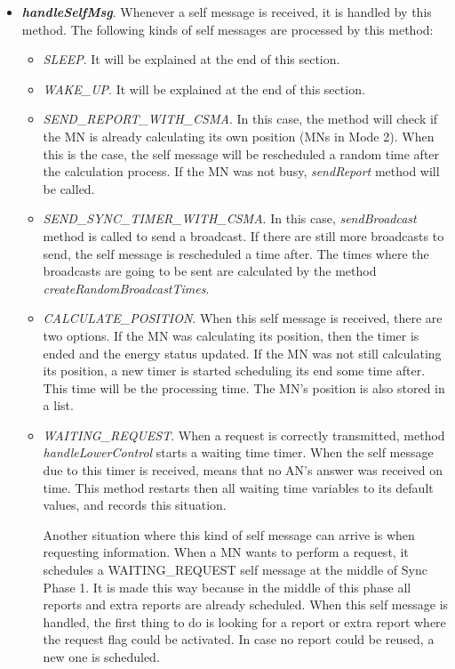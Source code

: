 \begin{itemize}
 \item \textbf{\textit{handleSelfMsg}}. Whenever a self message is received, it is handled by this method. The following kinds of self messages
are processed by this method:
 \begin{itemize}
  \item \textit{SLEEP}. It will be explained at the end of this section.

  \item \textit{WAKE\_UP}. It will be explained at the end of this section.

  \item \textit{SEND\_REPORT\_WITH\_CSMA}. In this case, the method will check if the \ac{MN} is already calculating its own position (\acp{MN} in
  Mode 2). When this is the case, the self message will be rescheduled a random time after the calculation process. If the \ac{MN} was not busy, 
  \textit{sendReport} method will be called.

  \item \textit{SEND\_SYNC\_TIMER\_WITH\_CSMA}. In this case, \textit{sendBroadcast} method is called to send a broadcast. If there are still 
  more broadcasts to send, the self message is rescheduled a time after. The times where the broadcasts are going to be sent are calculated by the
  method \textit{createRandomBroadcastTimes}.

  \item \textit{CALCULATE\_POSITION}. When this self message is received, there are two options. If the \ac{MN} was calculating its position, then
  the timer is ended and the energy status updated. If the \ac{MN} was not still calculating its position, a new timer is started scheduling its end
  some time after. This time will be the processing time. The \ac{MN}'s position is also stored in a list.

  \item \textit{WAITING\_REQUEST}. When a request is correctly transmitted, method \textit{handleLowerControl} starts a waiting time timer. When the
  self message due to this timer is received, means that no \ac{AN}'s answer was received on time. This method restarts then all waiting time 
  variables to its default values, and records this situation.

  Another situation where this kind of self message can arrive is when requesting information. When a \ac{MN} wants to perform a request, it 
  schedules a WAITING\_REQUEST self message at the middle of Sync Phase 1. It is made this way because in the middle of this phase all reports and 
  extra reports are already scheduled. When this self message is handled, the first thing to do is looking for a report or extra report where the 
  request flag could be activated. In case no report could be reused, a new one is scheduled.


\end{itemize}
\end{itemize}
